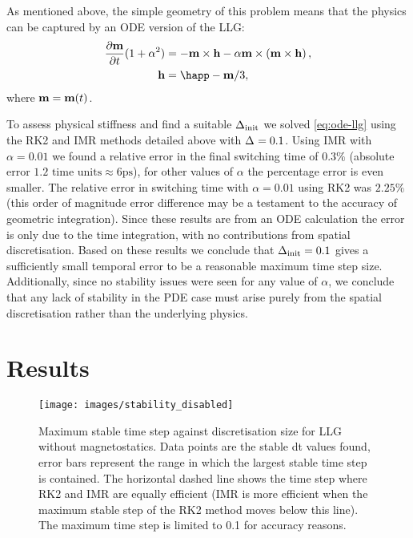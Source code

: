 As mentioned above, the simple geometry of this problem means that the physics can be captured by an ODE version of the LLG:
\begin{equation}
  \label{eq:ode-llg}
  \begin{aligned}
    \dmdt (1 + \dampc^2) &= - \mv \times \hv - \dampc \mv \times \left( \mv \times \hv \right), \\
    \hv &= \happ - \mv/3,
  \end{aligned}
\end{equation}
where $\mathbf{m} = \mathbf{m}(t)$.

To assess physical stiffness and find a suitable $\Delta_{\text{init}}$ we solved \cref{eq:ode-llg} using the RK2 and IMR methods detailed above with $\Delta_{} = 0.1$.
Using IMR with $\alpha = 0.01$ we found a relative error in the final switching time of $0.3\%$ (absolute error  $1.2 \text{ time units} \approx 6\text{ps}$), for other values of $\alpha$ the percentage error is even smaller.
The relative error in switching time with $\alpha = 0.01$ using RK2 was $2.25\%$ (this order of magnitude error difference may be a testament to the accuracy of geometric integration\cite{DAquino2005}).
Since these results are from an ODE calculation the error is only due to the time integration, with no contributions from spatial discretisation.
Based on these results we conclude that $\Delta_{\text{init}} = 0.1$ gives a sufficiently small temporal error to be a reasonable maximum time step size.
Additionally, since no stability issues were seen for any value of $\alpha$, we conclude that any lack of stability in the PDE case must arise purely from the spatial discretisation rather than the underlying physics.



\section{Results}


\begin{figure}
  \centering
  \texttt{[image: images/stability\_disabled]}
  \caption{Maximum stable time step against discretisation size for LLG without magnetostatics. Data points are the stable dt values found, error bars represent the range in which the largest stable time step is contained. The horizontal dashed line shows the time step where RK2 and IMR are equally efficient (IMR is more efficient when the maximum stable step of the RK2 method moves below this line). The maximum time step is limited to 0.1 for accuracy reasons.}
  \label{fig:no-hms-stability}
\end{figure}


